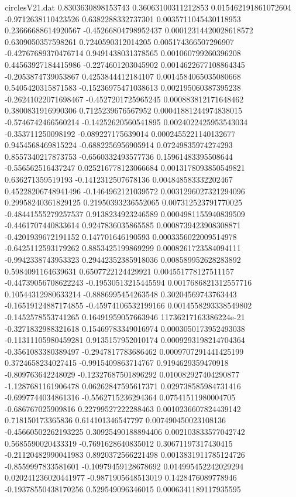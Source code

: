 \begin{filecontents}{circlesV21.dat}
0.8303630898153743	0.36063100311212853	0.015462191861072604
-0.9712638110423526	0.6382288332737301	0.0035711045430118953
0.23666688614920567	-0.45266804798952437	0.00012314420028618572
0.6309050357598261	0.7240590312014205	0.005174366507296907
-0.42767689370476714	0.9491438031378565	0.001060799260396208
0.44563927184415986	-0.2274601203045902	0.0014622677108864345
-0.2053874739053867	0.4253844412184107	0.0014584065035080668
0.5405420315871583	-0.15236975471038613	0.002195060387395238
-0.26241022071698467	-0.4527201725965245	0.000883812171648462
0.3800831916990306	0.7125239676567952	0.00041881244974838015
-0.5746742466560214	-0.14252620560541895	0.0024022425953543034
-0.353711250098192	-0.089227175639014	0.0002455221140132677
0.9454568469815224	-0.6882256956905914	0.07249835974274293
0.8557340217873753	-0.6560332493577736	0.15961483395508644
-0.556562516437247	0.025216778123066684	0.0013178093850549821
0.636271359519193	-0.1412312507678136	0.004848583332202467
0.45228206748941496	-0.1464962121039572	0.0031296027321294096
0.29958240361829125	0.21950393236552065	0.007312523791770025
-0.48441555279257537	0.9138234923246589	0.0004981155940839509
-0.4461707440833614	0.9247836035865585	0.0008739423908308871
-0.4201939672191152	0.147701646190593	0.0003356022009514978
-0.6425112593179262	0.8853425199869299	0.0008261723584094111
-0.9942338743953323	0.29442352385918036	0.008589952628283892
0.5984091164639631	0.6507722124429921	0.004551778127511157
-0.44739056708622243	-0.19530513215445594	0.0017686821312557716
0.10544312980633214	-0.8886995454263548	0.30204569743763443
-0.16519124887174855	-0.45974106532199166	0.0014558293338549802
-0.1452578553741265	0.16491959057663946	11736217163386224e-21
-0.3271832988321618	0.15469783349016974	0.0003050173952493038
-0.11311105980459281	0.9135157952010174	0.0009293198214704364
-0.3561083380389497	-0.2947817783686462	0.0009707291441425199
0.3724658234027415	-0.9915409863714767	0.9194629359470918
-0.809763642248029	-0.12327687501896292	0.010082927404290877
-1.1287681161906478	0.06262847595617371	0.029738585984731416
-0.6997744034861316	-0.5562715236294364	0.07541511980004705
-0.686767025909816	0.22799527222288463	0.0010236607824439142
0.718150173365836	0.614101346547797	0.007490450023108136
-0.45660502262193225	0.30925490188894406	0.002103833577042742
0.5685590020433319	-0.7691628640835012	0.30671197317430415
-0.21120482990041983	0.8920372566221498	0.0013831911785124726
-0.8559997833581601	-0.10979459128678692	0.014995452242029294
0.020241236020441977	-0.9871905648513019	0.1428476089778946
-0.19378550438170256	0.529549096346015	0.0006341189117935595

\end{filecontents}
